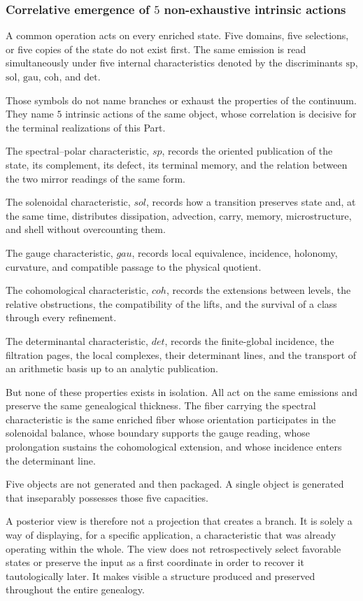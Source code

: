 \subsubsection{Correlative emergence of \texorpdfstring{\(5\)}{5} non-exhaustive intrinsic actions}
A common operation acts on every enriched state. Five domains, five selections, or five copies of the state do not exist first. The same emission is read simultaneously under five internal characteristics denoted by the discriminants \(\mathrm{sp}\), \(\mathrm{sol}\), \(\mathrm{gau}\), \(\mathrm{coh}\), and \(\mathrm{det}\).\par
Those symbols do not name branches or exhaust the properties of the continuum. They name
\(5\) intrinsic actions of the same object, whose correlation is decisive
for the terminal realizations of this Part.\par
The spectral–polar characteristic, \(sp\), records the oriented publication of the state, its complement, its defect, its terminal memory, and the relation between the two mirror readings of the same form.\par
The solenoidal characteristic, \(sol\), records how a transition preserves state and, at the same time, distributes dissipation, advection, carry, memory, microstructure, and shell without overcounting them.\par
The gauge characteristic, \(gau\), records local equivalence, incidence, holonomy, curvature, and compatible passage to the physical quotient.\par
The cohomological characteristic, \(coh\), records the extensions between levels, the relative obstructions, the compatibility of the lifts, and the survival of a class through every refinement.\par
The determinantal characteristic, \(det\), records the finite-global incidence, the filtration pages, the local complexes, their determinant lines, and the transport of an arithmetic basis up to an analytic publication.\par
But none of these properties exists in isolation. All act on the same emissions and preserve the same genealogical thickness. The fiber carrying the spectral characteristic is the same enriched fiber whose orientation participates in the solenoidal balance, whose boundary supports the gauge reading, whose prolongation sustains the cohomological extension, and whose incidence enters the determinant line.\par
Five objects are not generated and then packaged. A single object is generated that inseparably possesses those five capacities.\par
A posterior view is therefore not a projection that creates a branch. It is solely a way of displaying, for a specific application, a characteristic that was already operating within the whole. The view does not retrospectively select favorable states or preserve the input as a first coordinate in order to recover it tautologically later. It makes visible a structure produced and preserved throughout the entire genealogy.\par
{}
